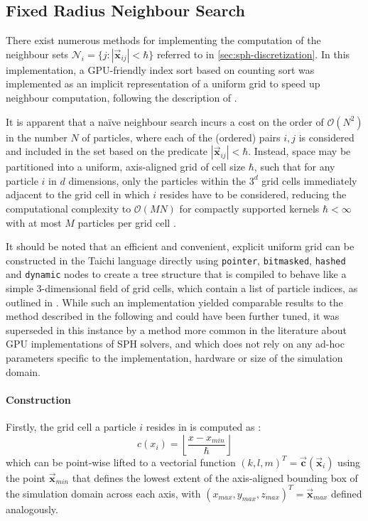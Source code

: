 \documentclass[oneside, a4paper]{book}
\newcommand\abs[1]{\left|#1\right|}
\newcommand\vek[1]{\vec{\bm{#1}}}
\newcommand\br[1]{\left(#1\right)}
\begin{document}
\begin{appendices}
    \chapter{Fixed Radius Neighbour Search}\label{appendix:fixed-radius-neighbour-search}
    There exist numerous methods for implementing the computation of the neighbour sets $\mathcal{N}_i = \{j : \abs{\vek{x}_{ij}}<\hbar\}$ referred to in \autoref{sec:sph-discretization}. In this implementation, a GPU-friendly index sort based on counting sort was implemented as an implicit representation of a uniform grid to speed up neighbour computation, following the description of \autocite[Hoetzlein]{hoetzlein-rama-counting-sort}. 

    It is apparent that a na\"ive neighbour search incurs a cost on the order of $\mathcal{O}\br{N^2}$ in the number $N$ of particles, where each of the (ordered) pairs $i,j$ is considered and included in the set based on the predicate $\abs{\vek{x}_{ij}}<\hbar$. Instead, space may be partitioned into a uniform, axis-aligned grid of cell size $\hbar$, such that for any particle $i$ in $d$ dimensions, only the particles within the $3^d$ grid cells immediately adjacent to the grid cell in which $i$ resides have to be considered, reducing the computational complexity to $\mathcal{O}(MN)$ for compactly supported kernels $\hbar<\infty$ with at most $M$ particles per grid cell \autocite{tutorial2019}. 
    
    It should be noted that an efficient and convenient, explicit uniform grid can be constructed in the Taichi language directly using \texttt{pointer}, \texttt{bitmasked}, \texttt{hashed} and \texttt{dynamic} nodes to create a tree structure that is compiled to behave like a simple 3-dimensional field of grid cells, which contain a list of particle indices, as outlined in \cite[this paper]{taichi-sparse}. While such an implementation yielded comparable results to the method described in the following and could have been further tuned, it was superseded in this instance by a method more common in the literature about GPU implementations of SPH solvers, and which does not rely on any ad-hoc parameters specific to the implementation, hardware or size of the simulation domain.

    \subsubsection{Construction}
    Firstly,  the grid cell a particle $i$ resides in is computed as \autocite{compressed-neighbour-lists}:
    \begin{equation}
      c(x_i) =  \left\lfloor\frac{x-x_{min}}{\hbar}\right\rfloor
    \end{equation}
    which can be point-wise lifted to a vectorial function $(k,l,m)^T = \vek{c}\br{\vek{x}_i}$ using the point $\vek{x}_{min}$ that defines the lowest extent of the axis-aligned bounding box of the simulation domain across each axis, with $(x_{max}, y_{max}, z_{max})^T = \vek{x}_{max}$ defined analogously. 
    

\end{appendices}
\end{document}
